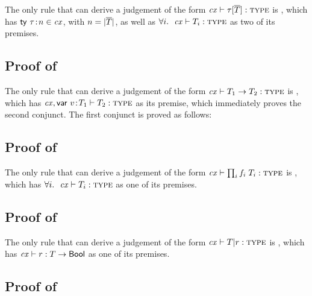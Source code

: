 The only rule that can derive a judgement of the form $\mathit{cx}\vdash\tau[\overline{T}]:\textsc{type}$ is
\Rtinst, which has $\mathsf{ty}\ \tau\!:\!n\in\mathit{cx}$, with $n=|\overline{T}|$, as well as
$\forall i.\ \ \mathit{cx}\vdash T_i:\textsc{type}$ as two of its premises.



\subsection*{Proof of }

The only rule that can derive a judgement of the form $\mathit{cx}\vdash T_1\to T_2:\textsc{type}$ is
\Rtarr, which has $\mathit{cx},\mathsf{var}\ v\!:\!T_1\vdash T_2:\textsc{type}$ as its
premise, which immediately proves the second conjunct. The first conjunct is
proved as follows:
\begin{derivation}
\end{derivation}



\subsection*{Proof of }

The only rule that can derive a judgement of the form $\mathit{cx}\vdash\prod_{i}f_i\;T_i:\textsc{type}$ is
\Rtrec, which has $\forall i.\ \ \mathit{cx}\vdash T_i:\textsc{type}$ as one of its premises.







\subsection*{Proof of }

The only rule that can derive a judgement of the form $\mathit{cx}\vdash T|r:\textsc{type}$ is
\Rtsub, which has $\mathit{cx}\vdash r:T\to\mathsf{Bool}$ as one of its
premises.



\subsection*{Proof of }


